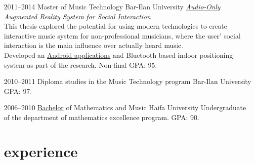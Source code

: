 \documentclass[]{friggeri-cv}  %
\begin{document}
\begin{entrylist}

    \entry
    {2011--2014}
    {Master {\normalfont of Music Technology}}
    {Bar-Ilan University}
    {\href{http://tomgurion.blogspot.co.il/p/master-thesis.html}{\emph{Audio-Only Augmented Reality System for Social Interaction}}\\
    This thesis explored the potential for using modern technologies to create interactive music system for non-professional musicians, where the user' social interaction is the main influence over actually heard music.\\
    Developed an \href{https://play.google.com/store/apps/developer?id=Nagasaki45}{Android applications} and Bluetooth based indoor positioning system as part of the research. Non-final GPA: 95.}
    
\end{entrylist}
\begin{entrylist}

    \entry
    {2010--2011}
    {Diploma studies {\normalfont in the Music Technology program}}
    {Bar-Ilan University}
    {GPA: 97.}
    
\end{entrylist}
\begin{entrylist}

    \entry
    {2006--2010}
    {\href{http://db.tt/i2NzAkni}{Bachelor} {\normalfont of Mathematics and Music}}
    {Haifa University}
    {Undergraduate of the department of mathematics excellence program. GPA: 90.}

\end{entrylist}


\section{experience}
\end{document}
